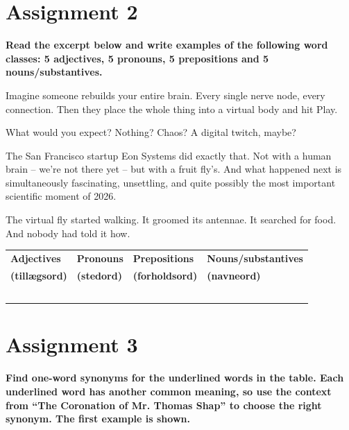 \documentclass[11pt,a4paper]{article}
\newenvironment{excerpt}{%
  \def\FrameCommand{\fboxsep=8pt\colorbox{lightblue}}%
  \MakeFramed{\advance\hsize-2\width\FrameRestore}%
}{\endMakeFramed}
\begin{document}
\newpage
\section{Assignment 2}

\textbf{Read the excerpt below and write examples of the following word classes: 5 adjectives, 5 pronouns, 5 prepositions and 5 nouns/substantives.}

\begin{excerpt}
Imagine someone rebuilds your entire brain. Every single nerve node, every connection. Then they place the whole thing into a virtual body and hit Play.

What would you expect? Nothing? Chaos? A digital twitch, maybe?

The San Francisco startup Eon Systems did exactly that. Not with a human brain – we’re not there yet – but with a fruit fly’s. And what happened next is simultaneously fascinating, unsettling, and quite possibly the most important scientific moment of 2026.

The virtual fly started walking. It groomed its antennae. It searched for food. And nobody had told it how.

\end{excerpt}

\begin{tabularx}{\textwidth}{|Y|Y|Y|Y|}
\hline
\textbf{Adjectives} & \textbf{Pronouns} & \textbf{Prepositions} & \textbf{Nouns/substantives} \\
\textbf{(tillægsord)} & \textbf{(stedord)} & \textbf{(forholdsord)} & \textbf{(navneord)} \\
\hline
 & & & \\[1.2cm]
\hline
 & & & \\[1.2cm]
\hline
 & & & \\[1.2cm]
\hline
 & & & \\[1.2cm]
\hline
 & & & \\[1.2cm]
\hline
\end{tabularx}

\newpage
\section{Assignment 3}

\textbf{Find one-word synonyms for the underlined words in the table. Each underlined word has another common meaning, so use the context from “The Coronation of Mr. Thomas Shap” to choose the right synonym. The first example is shown.}
\end{document}
